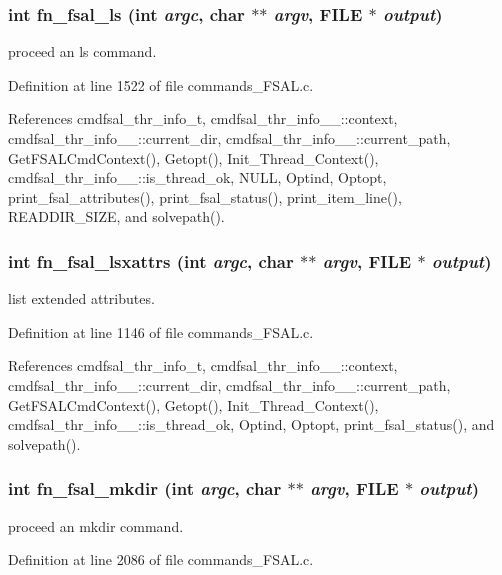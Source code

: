 \subsubsection{\setlength{\rightskip}{0pt plus 5cm}int fn\_\-fsal\_\-ls (int {\em argc}, char $\ast$$\ast$ {\em argv}, FILE $\ast$ {\em output})}\label{commands_8h_a10}


proceed an ls command. 

Definition at line 1522 of file commands\_\-FSAL.c.

References cmdfsal\_\-thr\_\-info\_\-t, cmdfsal\_\-thr\_\-info\_\-\_\-::context, cmdfsal\_\-thr\_\-info\_\-\_\-::current\_\-dir, cmdfsal\_\-thr\_\-info\_\-\_\-::current\_\-path, Get\-FSALCmd\-Context(), Getopt(), Init\_\-Thread\_\-Context(), cmdfsal\_\-thr\_\-info\_\-\_\-::is\_\-thread\_\-ok, NULL, Optind, Optopt, print\_\-fsal\_\-attributes(), print\_\-fsal\_\-status(), print\_\-item\_\-line(), READDIR\_\-SIZE, and solvepath().
\subsubsection{\setlength{\rightskip}{0pt plus 5cm}int fn\_\-fsal\_\-lsxattrs (int {\em argc}, char $\ast$$\ast$ {\em argv}, FILE $\ast$ {\em output})}\label{commands_8h_a33}


list extended attributes. 

Definition at line 1146 of file commands\_\-FSAL.c.

References cmdfsal\_\-thr\_\-info\_\-t, cmdfsal\_\-thr\_\-info\_\-\_\-::context, cmdfsal\_\-thr\_\-info\_\-\_\-::current\_\-dir, cmdfsal\_\-thr\_\-info\_\-\_\-::current\_\-path, Get\-FSALCmd\-Context(), Getopt(), Init\_\-Thread\_\-Context(), cmdfsal\_\-thr\_\-info\_\-\_\-::is\_\-thread\_\-ok, Optind, Optopt, print\_\-fsal\_\-status(), and solvepath().
\subsubsection{\setlength{\rightskip}{0pt plus 5cm}int fn\_\-fsal\_\-mkdir (int {\em argc}, char $\ast$$\ast$ {\em argv}, FILE $\ast$ {\em output})}\label{commands_8h_a14}


proceed an mkdir command. 

Definition at line 2086 of file commands\_\-FSAL.c.

